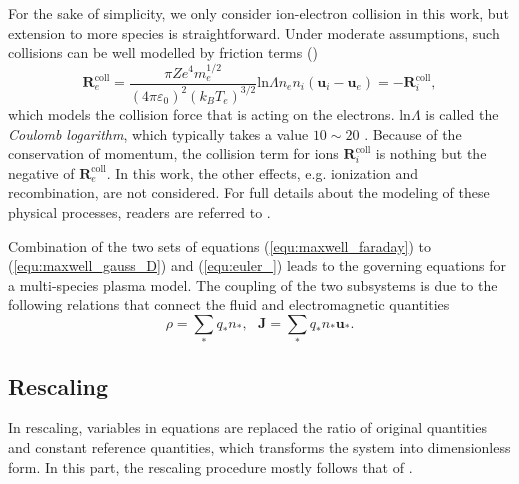 \documentclass{article}
\begin{document}
For the sake of simplicity, we only consider ion-electron collision in this work, but extension to more species is straightforward. Under moderate assumptions, such collisions can be well modelled by friction terms (\citep[][sec. 5.6.2]{chen2016})
\begin{equation} \label{equ:collision}
    \mathbf{R}_{e}^{\text{coll}} = \frac{\pi Ze^4m_e^{1/2}}{(4\pi\varepsilon_0)^2(k_BT_e)^{3/2}}\text{ln}\Lambda n_en_i(\mathbf{u}_i - \mathbf{u}_e) = - \mathbf{R}_{i}^{\text{coll}},  
\end{equation}
which models the collision force that is acting on the electrons. ln$\Lambda$ is called the \emph{Coulomb logarithm}, which typically takes a value $10\sim20$ \cite{chen2016}. Because of the conservation of momentum, the collision term for ions $\mathbf{R}_{i}^{\text{coll}}$ is nothing but the negative of $\mathbf{R}_{e}^{\text{coll}}$. In this work, the other effects, e.g. ionization and recombination, are not considered. For full details about the modeling of these physical processes, readers are referred to \cite{fuchs_2021}.  


Combination of the two sets of equations (\ref{equ:maxwell_faraday}) to (\ref{equ:maxwell_gauss_D}) and (\ref{equ:euler_}) leads to the governing equations for a multi-species plasma model. The coupling of the two subsystems is due to the following relations that connect the fluid and electromagnetic quantities
\begin{equation} \label{equ:maxwell_euler_coupling}
    \rho = \sum_* q_*n_*, \ \ \  \mathbf{J} = \sum_* q_*n_*\mathbf{u}_*. 
\end{equation}

\subsection{Rescaling} \label{sec:rescaling}
In rescaling, variables in equations are replaced the ratio of original quantities and constant reference quantities, which transforms the system into dimensionless form. In this part, the rescaling procedure mostly follows that of \cite{degond_2017}.
\end{document}
